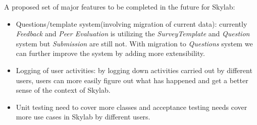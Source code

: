A proposed set of major features to be completed in the future for Skylab:

\begin{itemize}
  \item Questions/template system(involving migration of current data): currently \textit{Feedback} and \textit{Peer Evaluation} is utilizing the \textit{SurveyTemplate} and \textit{Question} system but \textit{Submission} are still not. With migration to \textit{Questions} system we can further improve the system by adding more extensibility.
  \item Logging of user activities: by logging down activities carried out by different users, users can more easily figure out what has happened and get a better sense of the context of Skylab.
  \item Unit testing need to cover more classes and acceptance testing needs cover more use cases in Skylab by different users.
\end{itemize}

